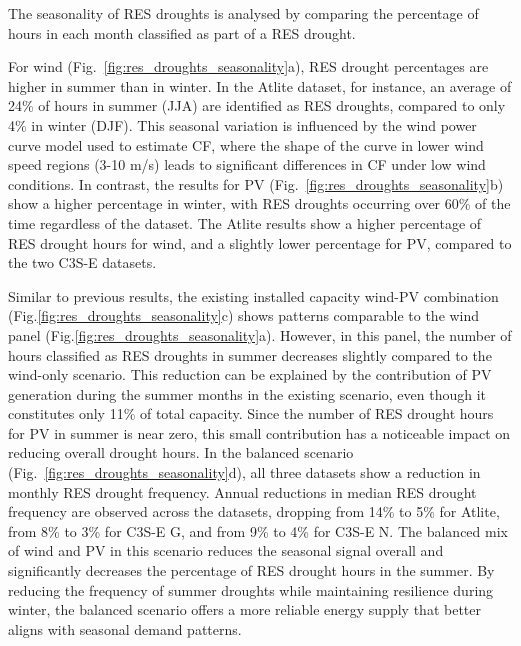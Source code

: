 \documentclass[a4paper, 11pt]{article}
\begin{document}
The seasonality of RES droughts is analysed by comparing the percentage of hours in each month classified as part of a RES drought. 

For wind (Fig.~\ref{fig:res_droughts_seasonality}a), RES drought percentages are higher in summer than in winter. In the Atlite dataset, for instance, an average of 24\% of hours in summer (JJA) are identified as RES droughts, compared to only 4\% in winter (DJF). This seasonal variation is influenced by the wind power curve model used to estimate CF, where the shape of the curve in lower wind speed regions (3-10 m/s) leads to significant differences in CF under low wind conditions. In contrast, the results for PV (Fig.~\ref{fig:res_droughts_seasonality}b) show a higher percentage in winter, with RES droughts occurring over 60\% of the time regardless of the dataset. The Atlite results show a higher percentage of RES drought hours for wind, and a slightly lower percentage for PV, compared to the two C3S-E datasets. 

Similar to previous results, the existing installed capacity wind-PV combination (Fig.\ref{fig:res_droughts_seasonality}c) shows patterns comparable to the wind panel (Fig.\ref{fig:res_droughts_seasonality}a). However, in this panel, the number of hours classified as RES droughts in summer decreases slightly compared to the wind-only scenario. This reduction can be explained by the contribution of PV generation during the summer months in the existing scenario, even though it constitutes only 11\% of total capacity. Since the number of RES drought hours for PV in summer is near zero, this small contribution has a noticeable impact on reducing overall drought hours. In the balanced scenario (Fig.~\ref{fig:res_droughts_seasonality}d), all three datasets show a reduction in monthly RES drought frequency. Annual reductions in median RES drought frequency are observed across the datasets, dropping from 14\% to 5\% for Atlite, from 8\% to 3\% for C3S-E G, and from 9\% to 4\% for C3S-E N. The balanced mix of wind and PV in this scenario reduces the seasonal signal overall and significantly decreases the percentage of RES drought hours in the summer. By reducing the frequency of summer droughts while maintaining resilience during winter, the balanced scenario offers a more reliable energy supply that better aligns with seasonal demand patterns.
\end{document}
